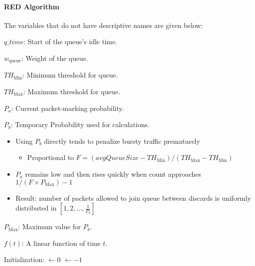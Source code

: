 \begin{definition}
\paragraph{RED Algorithm}\label{par:Random_Early_Discard_Algorithm}
The variables that do not have descriptive names are given below:
\begin{description}[noitemsep]
\item $q\_time$: Start of the queue's idle time.
\item $w_{\mathrm{queue}}$: Weight of the queue.
\item $TH_{\mathrm{Min}}$: Minimum threshold for queue.
\item $TH_{\mathrm{Max}}$: Maximum threshold for queue.
\item $P_{a}$: Current packet-marking probability.
\item $P_{b}$: Temporary Probability used for calculations.
  \begin{itemize}[noitemsep]
  \item Using $P_{b}$ directly tends to penalize bursty traffic prematurely
    \begin{itemize}[noitemsep]
    \item Proportional to $F=(avgQueueSize-TH_{\mathrm{Min}})/(TH_{\mathrm{Max}}-TH_{\mathrm{Min}})$
    \end{itemize}
\item $P_{a}$ remains low and then rises quickly when count approaches $1/(F \times P_{\mathrm{Max}})-1$
\item Result: number of packets allowed to join queue between discards is uniformly distributed in $\left[1, 2, \ldots, \frac{1}{P_{b}} \right]$
  \end{itemize}
\item $P_{\mathrm{Max}}$: Maximum value for $P_{b}$.
\item $f(t)$: A linear function of time $t$.
\end{description}

\begin{algorithm}[H]
  \DontPrintSemicolon{}
  \BlankLine{}

  Initialization: \;
  \AvgQueueSize$\leftarrow 0$ \;
  \CountLastDiscard$\leftarrow -1$ \;


\end{algorithm}
\end{definition}
